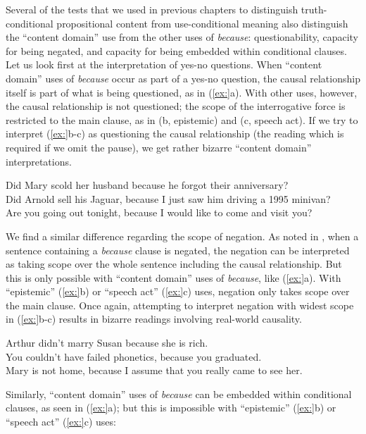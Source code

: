 Several of the tests that we used in previous chapters to distinguish truth-conditional propositional content from use-conditional meaning also distinguish the “content domain” use from the other uses of \textit{because}: questionability, capacity for being negated, and capacity for being embedded within conditional clauses. Let us look first at the interpretation of yes-no questions. When “content domain” uses of \textit{because} occur as part of a yes-no question, the causal relationship itself is part of what is being questioned, as in (\ref{ex:}a). With other uses, however, the causal relationship is not questioned; the scope of the interrogative force is restricted to the main clause, as in (b, epistemic) and (c, speech act). If we try to interpret (\ref{ex:}b-c) as questioning the causal relationship (the reading which is required if we omit the pause), we get rather bizarre “content domain” interpretations.


\ea
\ea Did Mary scold her husband because he forgot their anniversary?\\
\ex Did Arnold sell his Jaguar, because I just saw him driving a 1995 minivan?\\
\ex Are you going out tonight, because I would like to come and visit you?
                       \z
\z


We find a similar difference regarding the scope of negation. As noted in , when a sentence containing a \textit{because} clause is negated, the negation can be interpreted as taking scope over the whole sentence including the causal relationship. But this is only possible with “content domain” uses of \textit{because}, like (\ref{ex:}a). With “epistemic” (\ref{ex:}b) or “speech act” (\ref{ex:}c) uses, negation only takes scope over the main clause. Once again, attempting to interpret negation with widest scope in (\ref{ex:}b-c) results in bizarre readings involving real-world causality.


\ea
\ea Arthur didn’t marry Susan because she is rich.\\
\ex You couldn’t have failed phonetics, because you graduated.\\
\ex Mary is not home, because I assume that you really came to see her.
                       \z
\z


Similarly, “content domain” uses of \textit{because} can be embedded within conditional clauses, as seen in (\ref{ex:}a); but this is impossible with “epistemic” (\ref{ex:}b) or “speech act” (\ref{ex:}c) uses:


